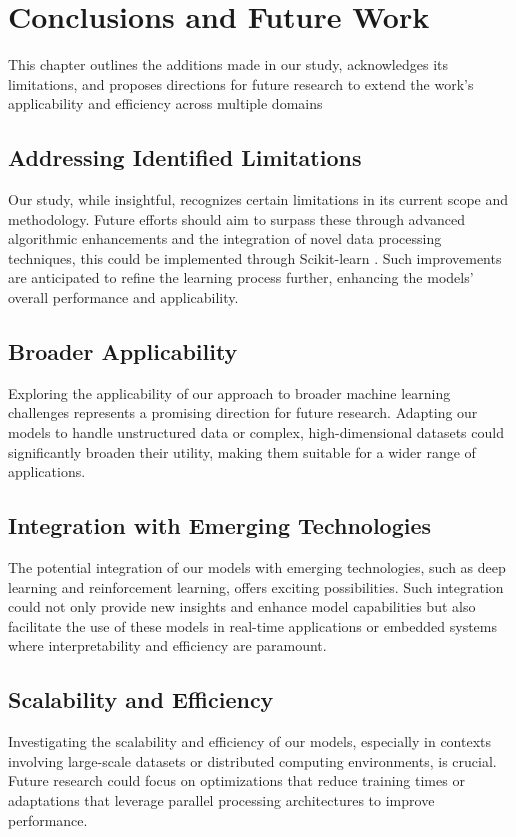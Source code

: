 \documentclass[a4paper, 12pt]{report}
\begin{document}
\chapter{Conclusions and Future Work}
\label{ch:Conclusions and Future Work}
This chapter outlines the additions made in our study, acknowledges its limitations, and proposes directions for future research to extend 
the work's applicability and efficiency across multiple domains
\section{Addressing Identified Limitations}
Our study, while insightful, recognizes certain limitations in its current scope and methodology. 
Future efforts should aim to surpass these through advanced algorithmic enhancements and the integration of novel data processing techniques, this could be implemented through 
Scikit-learn \cite{scikit}. Such improvements are anticipated to refine the learning process further, enhancing the models' overall performance and applicability.

\section{Broader Applicability}
Exploring the applicability of our approach to broader machine learning challenges represents a promising direction for future research. 
Adapting our models to handle unstructured data or complex, high-dimensional datasets could significantly broaden their utility, making them suitable for a wider range of applications.

\section{Integration with Emerging Technologies}
The potential integration of our models with emerging technologies, such as deep learning and reinforcement learning, offers exciting possibilities. 
Such integration could not only provide new insights and enhance model capabilities but also facilitate the use of these models in real-time applications or 
embedded systems where interpretability and efficiency are paramount.

\section{Scalability and Efficiency}
Investigating the scalability and efficiency of our models, especially in contexts involving large-scale datasets or distributed computing environments, is crucial. 
Future research could focus on optimizations that reduce training times or adaptations that leverage parallel processing architectures to improve performance.
\end{document}
